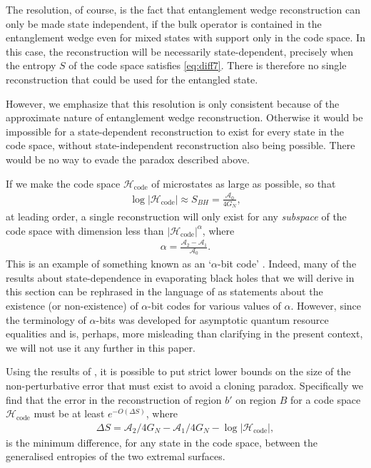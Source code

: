 \documentclass[11pt,a4paper]{article}
\begin{document}
The resolution, of course, is the fact that entanglement wedge reconstruction can only be made state independent, if the bulk operator is contained in the entanglement wedge even for mixed states with support only in the code space. In this case, the reconstruction will be necessarily state-dependent, precisely when the entropy $S$ of the code space satisfies \eqref{eq:diff7}. There is therefore no single reconstruction that could be used for the entangled state.

However, we emphasize that this resolution is only consistent because of the approximate nature of entanglement wedge reconstruction. Otherwise it would be impossible for a state-dependent reconstruction to exist for every state in the code space, without state-independent reconstruction also being possible. There would be no way to evade the paradox described above.

If we make the code space $\mathcal{H}_\text{code}$ of microstates as large as possible, so that 
\begin{align}
\log |\mathcal{H}_\text{code}| \approx S_{BH} = \frac{\mathcal{A}_0}{4 G_N},
\end{align}
at leading order,  a single reconstruction will only exist for any \emph{subspace} of the code space with dimension less than $|\mathcal{H}_\text{code}|^\alpha$, where
\begin{align}
\alpha = \frac{\mathcal{A}_2 - \mathcal{A}_1}{\mathcal{A}_0}.
\end{align}
This is an example of something known as an `$\alpha$-bit code' \cite{alphabits}. Indeed, many of the results about state-dependence in evaporating black holes that we will derive in this section can be rephrased in the language of \cite{alphabits} as statements about the existence (or non-existence) of $\alpha$-bit codes for various values of $\alpha$. However, since the terminology of $\alpha$-bits was developed for asymptotic quantum resource equalities and is, perhaps, more misleading than clarifying in the present context, we will not use it any further in this paper.

Using the results of \cite{alphabits}, it is possible to put strict lower bounds on the size of the non-perturbative error that must exist to avoid a cloning paradox. Specifically we find that the error in the reconstruction of region $b'$ on region $B$ for a code space $\mathcal{H}_\text{code}$ must be at least $e^{-O(\Delta S)}$, where 
\begin{align}
\Delta S = \mathcal{A}_2/4G_N - \mathcal{A}_1/4G_N - \log |\mathcal{H}_\text{code}|,
\end{align}
is the minimum difference, for any state in the code space, between the generalised entropies of the two extremal surfaces\cite{hayden2018learning}.
\end{document}
